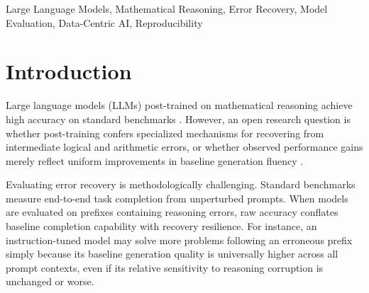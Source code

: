 \documentclass[conference]{IEEEtran}
\begin{document}
\begin{IEEEkeywords}
Large Language Models, Mathematical Reasoning, Error Recovery, Model Evaluation, Data-Centric AI, Reproducibility
\end{IEEEkeywords}

\section{Introduction}
Large language models (LLMs) post-trained on mathematical reasoning achieve high accuracy on standard benchmarks \cite{cobbe2021gsm8k, qwen25math2024}. However, an open research question is whether post-training confers specialized mechanisms for recovering from intermediate logical and arithmetic errors, or whether observed performance gains merely reflect uniform improvements in baseline generation fluency \cite{lightman2023process, zelikman2022star, madaan2023selfrefine, huang2023large, kumar2024training}.

Evaluating error recovery is methodologically challenging. Standard benchmarks measure end-to-end task completion from unperturbed prompts. When models are evaluated on prefixes containing reasoning errors, raw accuracy conflates baseline completion capability with recovery resilience. For instance, an instruction-tuned model may solve more problems following an erroneous prefix simply because its baseline generation quality is universally higher across all prompt contexts, even if its relative sensitivity to reasoning corruption is unchanged or worse.
\end{document}
